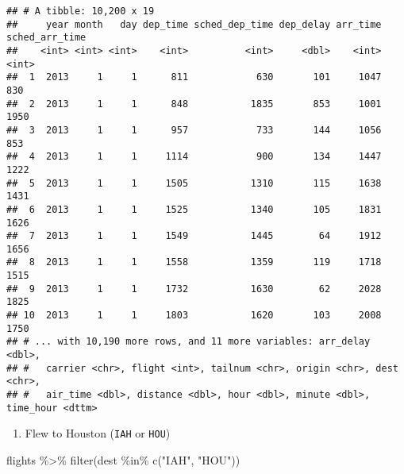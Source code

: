 \documentclass[
]{article}
\newenvironment{Shaded}{\begin{snugshade}}{\end{snugshade}}
\newcommand{\FunctionTok}[1]{\textcolor[rgb]{0.00,0.00,0.00}{#1}}
\newcommand{\NormalTok}[1]{#1}
\newcommand{\SpecialCharTok}[1]{\textcolor[rgb]{0.00,0.00,0.00}{#1}}
\newcommand{\StringTok}[1]{\textcolor[rgb]{0.31,0.60,0.02}{#1}}
\providecommand{\tightlist}{%
  \setlength{\itemsep}{0pt}\setlength{\parskip}{0pt}}
\begin{document}
\begin{verbatim}
## # A tibble: 10,200 x 19
##     year month   day dep_time sched_dep_time dep_delay arr_time sched_arr_time
##    <int> <int> <int>    <int>          <int>     <dbl>    <int>          <int>
##  1  2013     1     1      811            630       101     1047            830
##  2  2013     1     1      848           1835       853     1001           1950
##  3  2013     1     1      957            733       144     1056            853
##  4  2013     1     1     1114            900       134     1447           1222
##  5  2013     1     1     1505           1310       115     1638           1431
##  6  2013     1     1     1525           1340       105     1831           1626
##  7  2013     1     1     1549           1445        64     1912           1656
##  8  2013     1     1     1558           1359       119     1718           1515
##  9  2013     1     1     1732           1630        62     2028           1825
## 10  2013     1     1     1803           1620       103     2008           1750
## # ... with 10,190 more rows, and 11 more variables: arr_delay <dbl>,
## #   carrier <chr>, flight <int>, tailnum <chr>, origin <chr>, dest <chr>,
## #   air_time <dbl>, distance <dbl>, hour <dbl>, minute <dbl>, time_hour <dttm>
\end{verbatim}

\begin{enumerate}
\def\labelenumi{\arabic{enumi}.}
\setcounter{enumi}{1}
\tightlist
\item
  Flew to Houston (\texttt{IAH} or \texttt{HOU})
\end{enumerate}

\begin{Shaded}
\begin{Highlighting}[]
\NormalTok{flights }\SpecialCharTok{\%\textgreater{}\%} \FunctionTok{filter}\NormalTok{(dest }\SpecialCharTok{\%in\%} \FunctionTok{c}\NormalTok{(}\StringTok{"IAH"}\NormalTok{, }\StringTok{"HOU"}\NormalTok{))}
\end{Highlighting}
\end{Shaded}
\end{document}
